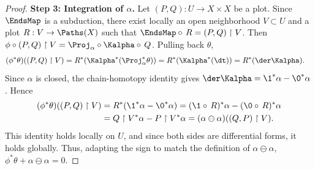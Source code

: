 \begin{proof}
  \textbf{Step 3: Integration of\/ $\alpha$.}
  Let $(P,Q): U \to X \times X$ be a plot.
  Since $\EndsMap$ is a subduction,
  there exist locally an open neighborhood $V \subset U$ and a plot
  $R: V \to \Paths(X)$ such that $\EndsMap \circ\, R = (P,Q)\restriction V$.
  Then $\phi \circ (P,Q)\restriction V = \Proj_\alpha \circ \Kalpha \circ\, Q$.
  Pulling back $\theta$,
  \begin{align*}
    (\phi^*\theta)((P,Q)\restriction V)
    &= R^*(\Kalpha^*(\Proj_\alpha^*\theta))
    = R^*(\Kalpha^*(\dt))
    = R^*(\der\Kalpha).
  \end{align*}
  Since $\alpha$ is closed,
  the chain-homotopy identity gives $\der\Kalpha = \1^*\alpha - \0^*\alpha$.
  Hence
  \begin{align*}
    (\phi^*\theta)((P,Q)\restriction V)
    &= R^*(\1^*\alpha - \0^*\alpha)
    = (\1 \circ\, R)^*\alpha - (\0 \circ\, R)^*\alpha \\
    &= Q\restriction V^*\alpha - P\restriction V^*\alpha
    = (\alpha \ominus \alpha)((Q,P)\restriction V).
  \end{align*}
  This identity holds locally on $U$,
  and since both sides are differential forms,
  it holds globally.
  Thus,
  adapting the sign to match the definition of $\alpha \ominus \alpha$,
  $\phi^*\theta + \alpha \ominus \alpha = 0$.
\end{proof}

